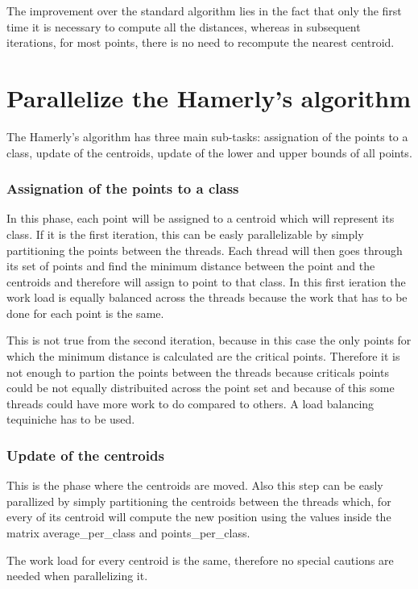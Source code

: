 \documentclass{report}
\begin{document}
\begin{minipage}[b]{0.48\textwidth}
    The improvement over the standard algorithm lies in the fact that only the first time it is necessary to compute all the distances, whereas in subsequent iterations, for most points, there is no need to recompute the nearest centroid.

    \section*{Parallelize the Hamerly's algorithm}
  The Hamerly's algorithm has three main sub-tasks: assignation of the points to a class, update of the centroids, update of the lower and upper bounds of all points.

  \subsubsection*{Assignation of the points to a class}
  In this phase, each point will be assigned to a centroid which will represent its class. If it is the first iteration, this can be easly parallelizable by simply partitioning the points between the threads. Each thread will then goes through its set of points and find the minimum distance between the point and the centroids and therefore will assign to point to that class. In this first ieration the work load is equally balanced across the threads because the work that has to be done for each point is the same.

  This is not true from the second iteration, because in this case the only points for which the minimum distance is calculated are the critical points. Therefore it is not enough to partion the points between the threads because criticals points could be not equally distribuited across the point set and because of this some threads could have more work to do compared to others. A load balancing tequiniche has to be used.

  \subsubsection*{Update of the centroids}
  This is the phase where the centroids are moved. Also this step can be easly parallized by simply partitioning the centroids between the threads which, for every of its centroid will compute the new position using the values inside the matrix average\_per\_class and points\_per\_class.

  The work load for every centroid is the same, therefore no special cautions are needed when parallelizing it.


\end{minipage}
\end{document}
